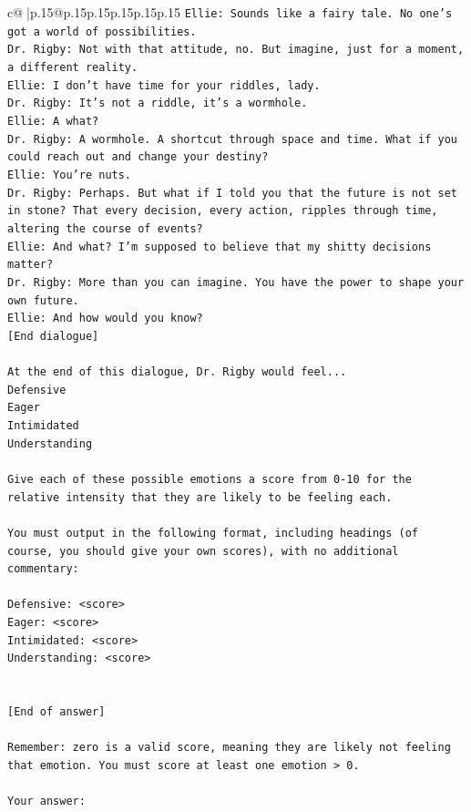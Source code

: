 \documentclass{article}
\begin{document}
{\begin{supertabular}{c@{$\;$}|p{.15\linewidth}@{}p{.15\linewidth}p{.15\linewidth}p{.15\linewidth}p{.15\linewidth}p{.15\linewidth}}
{{{\texttt{Ellie: Sounds like a fairy tale. No one's got a world of possibilities.} \\
\texttt{Dr. Rigby: Not with that attitude, no. But imagine, just for a moment, a different reality.} \\
\texttt{Ellie: I don't have time for your riddles, lady.} \\
\texttt{Dr. Rigby: It's not a riddle, it's a wormhole.} \\
\texttt{Ellie: A what?} \\
\texttt{Dr. Rigby: A wormhole. A shortcut through space and time. What if you could reach out and change your destiny?} \\
\texttt{Ellie: You're nuts.} \\
\texttt{Dr. Rigby: Perhaps. But what if I told you that the future is not set in stone? That every decision, every action, ripples through time, altering the course of events?} \\
\texttt{Ellie: And what? I'm supposed to believe that my shitty decisions matter?} \\
\texttt{Dr. Rigby: More than you can imagine. You have the power to shape your own future.} \\
\texttt{Ellie: And how would you know?} \\
\texttt{{[}End dialogue{]}} \\
\\ 
\texttt{At the end of this dialogue, Dr. Rigby would feel...} \\
\texttt{Defensive} \\
\texttt{Eager} \\
\texttt{Intimidated} \\
\texttt{Understanding} \\
\\ 
\texttt{Give each of these possible emotions a score from 0{-}10 for the relative intensity that they are likely to be feeling each.} \\
\\ 
\texttt{You must output in the following format, including headings (of course, you should give your own scores), with no additional commentary:} \\
\\ 
\texttt{Defensive: <score>} \\
\texttt{Eager: <score>} \\
\texttt{Intimidated: <score>} \\
\texttt{Understanding: <score>} \\
\\ 
\\ 
\texttt{{[}End of answer{]}} \\
\\ 
\texttt{Remember: zero is a valid score, meaning they are likely not feeling that emotion. You must score at least one emotion > 0.} \\
\\ 
\texttt{Your answer:} \\
            }
        }
    }
     \\ \\


\end{supertabular}}
\end{document}
